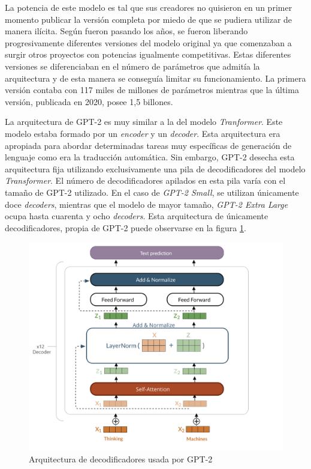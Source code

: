 La potencia de este modelo es tal que sus creadores no quisieron en un primer momento publicar la versión completa por miedo de que se pudiera utilizar de manera ilícita. Según fueron pasando los años, se fueron liberando progresivamente diferentes versiones del modelo original ya que comenzaban a surgir otros proyectos con potencias igualmente competitivas. Estas diferentes versiones se diferenciaban en el número de parámetros que admitía la arquitectura y de esta manera se conseguía limitar su funcionamiento. La primera versión contaba con 117 miles de millones de parámetros mientras que la última versión, publicada en 2020, posee 1,5 billones.


La arquitectura de GPT-2 es muy similar a la del modelo \textit{Tranformer}. Este modelo estaba formado por un \textit{encoder} y un \textit{decoder}. Esta arquitectura era apropiada para abordar determinadas tareas muy específicas de generación de lenguaje como era la traducción automática. Sin embargo, GPT-2 desecha esta arquitectura fija utilizando exclusivamente una pila de decodificadores del modelo \textit{Transformer}. El número de decodificadores apilados en esta pila varía con el tamaño de GPT-2 utilizado. En el caso de \textit{GPT-2 Small}, se utilizan únicamente doce \textit{decoders}, mientras que el modelo de mayor tamaño, \textit{GPT-2 Extra Large} ocupa hasta cuarenta y ocho \textit{decoders}. Esta arquitectura de únicamente decodificadores, propia de GPT-2 puede observarse en la figura \ref{fig:gpt2_architecture}.


\begin{figure}[!h]
	\centering
	\includegraphics[width=1.0\textwidth]{Imagenes/Bitmap/02EstadoDeLaCuestion/gpt2_architecture}%
	\caption{Arquitectura de decodificadores usada por GPT-2%
		\label{fig:gpt2_architecture}}
\end{figure}


